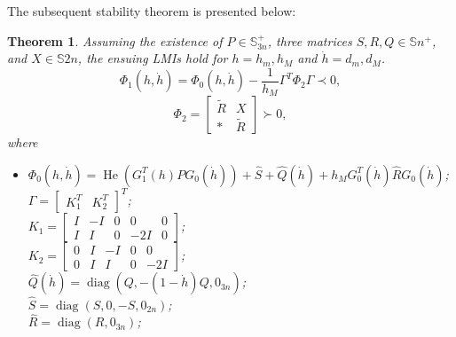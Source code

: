 \documentclass[journal]{IEEEtran}
\newtheorem{theorem}{Theorem}
\begin{document}
The subsequent stability theorem is presented below:
\begin{theorem}
  \label{theorem6}
  Assuming the existence of $ P \in \mathbb{S}_{3n}^ + $, three matrices $ S, R, Q \in \mathbb{S}n^ + $, and $ X \in \mathbb{S}{2n} $, the ensuing LMIs hold for $ h = { {h_m},{h_M}} $ and $ \dot h = { {d_m},{d_M}} $.
  \begin{equation}
    \label{eq25}
    {\Phi _1}(h,\dot h) = {\Phi _0}(h,\dot h) - \frac{1}{{{h_M}}}{\Gamma ^T}{\Phi _2}\Gamma  \prec 0,
  \end{equation}
  \begin{equation}
    \label{eq26}
    {\Phi _2} = \left[ {\begin{array}{*{20}{c}}
            {\tilde R} & X          \\
            *          & {\tilde R}
          \end{array}} \right] \succ 0,
  \end{equation}
  where
  \begin{itemize}
    \item[]
      $ {\Phi _0}(h,\dot h) = \operatorname{He} \left( {G_1^T(h)P{G_0}(\dot h)} \right) + \hat S + \hat Q(\dot h) + {h_M}G_0^T(\dot h)\hat R{G_0}(\dot h) $;                     \\
      $ \Gamma  = {\left[ {\begin{array}{*{20}{c}}
                {K_1^T} & {K_2^T}
              \end{array}} \right]^T} $;\\
      $ {K_1} = \left[ {\begin{array}{*{20}{c}}
                I & { - I} & 0 & 0       & 0 \\
                I & I      & 0 & { - 2I} & 0
              \end{array}} \right] $;\\
      $ {K_2} = \left[ {\begin{array}{*{20}{c}}
                0 & I & { - I} & 0 & 0       \\
                0 & I & I      & 0 & { - 2I}
              \end{array}} \right] $;\\
      $ \hat Q(\dot h) = \operatorname{diag} \left( {Q, - (1 - \dot h)Q,{0_{3n}}} \right) $;\\
      $ \hat S = \operatorname{diag} \left( {S,0, - S,{0_{2n}}} \right) $;\\
      $ \hat R = \operatorname{diag} \left( {R,{0_{3n}}} \right) $;\\

\end{itemize}
\end{theorem}
\end{document}
